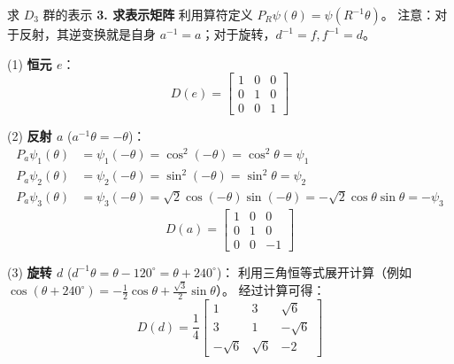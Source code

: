 \begin{example}{求 $D_3$ 群的表示}
    \textbf{3. 求表示矩阵}
    利用算符定义 $P_R \psi(\theta) = \psi(R^{-1}\theta)$。
    注意：对于反射，其逆变换就是自身 $a^{-1}=a$；对于旋转，$d^{-1}=f, f^{-1}=d$。
    
    (1) \textbf{恒元 $e$}：
    \begin{equation}
        D(e) = \begin{bmatrix} 1 & 0 & 0 \\ 0 & 1 & 0 \\ 0 & 0 & 1 \end{bmatrix}
    \end{equation}

    (2) \textbf{反射 $a$} ($a^{-1}\theta = -\theta$)：
    \begin{equation}
        \begin{aligned}
            P_a\psi_1(\theta) &= \psi_1(-\theta) = \cos^2(-\theta) = \cos^2\theta = \psi_1 \\
            P_a\psi_2(\theta) &= \psi_2(-\theta) = \sin^2(-\theta) = \sin^2\theta = \psi_2 \\
            P_a\psi_3(\theta) &= \psi_3(-\theta) = \sqrt{2}\cos(-\theta)\sin(-\theta) = -\sqrt{2}\cos\theta\sin\theta = -\psi_3
        \end{aligned}
    \end{equation}
    \begin{equation}
        D(a) = \begin{bmatrix} 1 & 0 & 0 \\ 0 & 1 & 0 \\ 0 & 0 & -1 \end{bmatrix}
    \end{equation}
    
    (3) \textbf{旋转 $d$} ($d^{-1}\theta = \theta - 120^\circ = \theta + 240^\circ$)：
    利用三角恒等式展开计算（例如 $\cos(\theta+240^\circ) = -\frac{1}{2}\cos\theta + \frac{\sqrt{3}}{2}\sin\theta$）。
    经过计算可得：
    \begin{equation}
        D(d) = \frac{1}{4} \begin{bmatrix} 1 & 3 & \sqrt{6} \\ 3 & 1 & -\sqrt{6} \\ -\sqrt{6} & \sqrt{6} & -2 \end{bmatrix}
    \end{equation}
   

\end{example}
